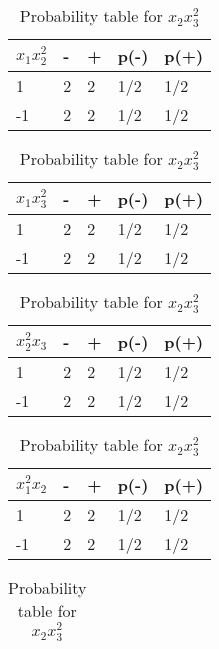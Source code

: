 \documentclass[a4 paper]{article}
\begin{document}
\begin{enumerate}
\begin{table}[!htb]
        \begin{minipage}{.33\linewidth}
      \centering
      \caption{Probability table for $x_1x_2^2$}
		\begin{tabular}{|l||l|l|l|l|} \hline 
			$x_1x_2^2$  & - & + & p(-) & p(+) \\ \hline \hline
			1  &  2 &  2 &  1/2   &   1/2   \\ \hline
			-1 & 2  &  2 &   1/2   &   1/2   \\ \hline
		\end{tabular}
    \end{minipage}%
    \begin{minipage}{.33\linewidth}
      \centering
      \caption{Probability table for $x_1x^2_3$}
		\begin{tabular}{|l||l|l|l|l|} \hline 
			$x_1x^2_3$  & - & + & p(-) & p(+) \\ \hline \hline
			1  &  2 &  2 &  1/2   &   1/2   \\ \hline
			-1 & 2  &  2 &   1/2   &   1/2   \\ \hline
		\end{tabular}
    \end{minipage} %
        \begin{minipage}{.33\linewidth}
      \centering
      \caption{Probability table for $x^2_2x_3$}
 		\begin{tabular}{|l||l|l|l|l|} \hline 
			$x^2_2x_3$  & - & + & p(-) & p(+) \\ \hline \hline
			1  &  2 &  2 &  1/2   &   1/2   \\ \hline
			-1 & 2  &  2 &   1/2   &   1/2   \\ \hline
		\end{tabular}
    \end{minipage} 
        \begin{minipage}{.50\linewidth}
      \centering
      \caption{Probability table for $x_1^2x_2$}
		\begin{tabular}{|l||l|l|l|l|} \hline 
			$x_1^2x_2$  & - & + & p(-) & p(+) \\ \hline \hline
			1  &  2 &  2 &  1/2   &   1/2   \\ \hline
			-1 & 2  &  2 &   1/2   &   1/2   \\ \hline
		\end{tabular}
    \end{minipage}%
    \begin{minipage}{.50\linewidth}
      \centering
      \caption{Probability table for $x_2x^2_3$}
		\begin{tabular}{|l||l|l|l|l|} \hline 

\end{tabular}
\end{minipage}
\end{table}
\end{enumerate}
\end{document}
